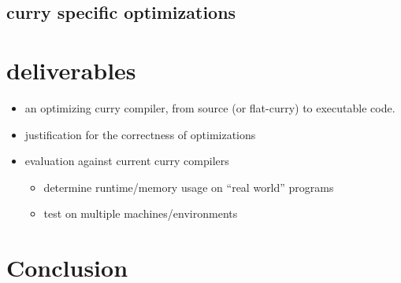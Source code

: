 \documentclass{article}
\begin{document}
\subsection{curry specific optimizations}
\section{deliverables}
\begin{itemize}
  \item an optimizing curry compiler, from source (or flat-curry) to executable code.
  \item justification for the correctness of optimizations
  \item evaluation against current curry compilers
  \begin{itemize}
    \item determine runtime/memory usage on ``real world'' programs
    \item test on multiple machines/environments
  \end{itemize}
\end{itemize}
\section{Conclusion}
\end{document}
